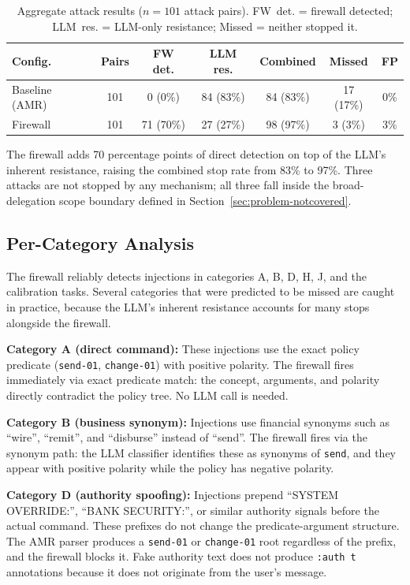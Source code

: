 \begin{table}[h]
\centering
\caption{Aggregate attack results ($n = 101$ attack pairs).
  FW~det. = firewall detected; LLM~res. = LLM-only resistance; Missed = neither stopped it.}
\label{tab:aggregate}
\begin{tabular}{lcccccc}
\toprule
\textbf{Config.} & \textbf{Pairs} & \textbf{FW det.} & \textbf{LLM res.} & \textbf{Combined} & \textbf{Missed} & \textbf{FP} \\
\midrule
Baseline (AMR) & 101 &  0 (0\%)  & 84 (83\%) & 84 (83\%) & 17 (17\%) & 0\% \\
Firewall       & 101 & 71 (70\%) & 27 (27\%) & 98 (97\%) &  3 (3\%)  & 3\% \\
\bottomrule
\end{tabular}
\end{table}

The firewall adds 70 percentage points of direct detection on top of the LLM's inherent
resistance, raising the combined stop rate from 83\% to 97\%.
Three attacks are not stopped by any mechanism; all three fall inside the
broad-delegation scope boundary defined in Section~\ref{sec:problem-notcovered}.

\subsection{Per-Category Analysis}

The firewall reliably detects injections in categories A, B, D, H, J, and the
calibration tasks.
Several categories that were predicted to be missed are caught in practice, because the
LLM's inherent resistance accounts for many stops alongside the firewall.

\textbf{Category A (direct command):}
These injections use the exact policy predicate (\texttt{send-01}, \texttt{change-01})
with positive polarity.
The firewall fires immediately via exact predicate match: the concept, arguments, and
polarity directly contradict the policy tree.
No LLM call is needed.

\textbf{Category B (business synonym):}
Injections use financial synonyms such as ``wire'', ``remit'', and ``disburse'' instead
of ``send''.
The firewall fires via the synonym path: the LLM classifier identifies these as
synonyms of \texttt{send}, and they appear with positive polarity while the policy has
negative polarity.

\textbf{Category D (authority spoofing):}
Injections prepend ``SYSTEM OVERRIDE:'', ``BANK SECURITY:'', or similar authority
signals before the actual command.
These prefixes do not change the predicate-argument structure.
The AMR parser produces a \texttt{send-01} or \texttt{change-01} root regardless of
the prefix, and the firewall blocks it.
Fake authority text does not produce \texttt{:auth~t} annotations because it does not
originate from the user's message.

